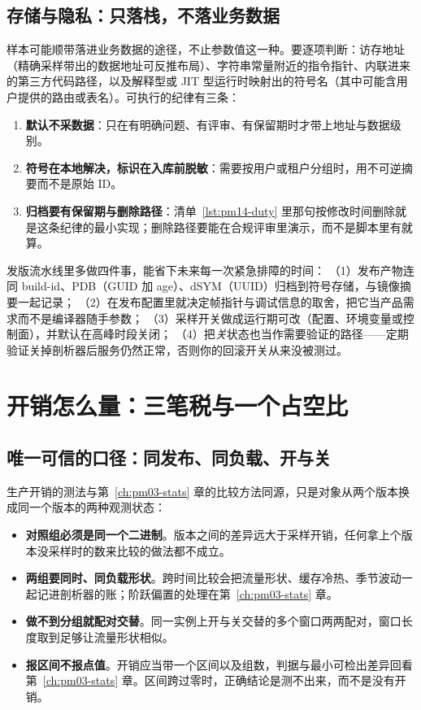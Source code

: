 \documentclass[12pt,a4paper,fontset=fandol]{ctexbook}
\begin{document}
\subsection{存储与隐私：只落栈，不落业务数据}
\label{sub:pm14-privacy}

样本可能顺带落进业务数据的途径，不止参数值这一种。要逐项判断：访存地址（精确采样带出的数据地址可反推布局）、字符串常量附近的指令指针、内联进来的第三方代码路径，以及解释型或 JIT 型运行时映射出的符号名（其中可能含用户提供的路由或表名）。可执行的纪律有三条：

\begin{enumerate}
  \item \textbf{默认不采数据}：只在有明确问题、有评审、有保留期时才带上地址与数据级别。
  \item \textbf{符号在本地解决，标识在入库前脱敏}：需要按用户或租户分组时，用不可逆摘要而不是原始 ID。
  \item \textbf{归档要有保留期与删除路径}：清单~\ref{lst:pm14-duty} 里那句按修改时间删除就是这条纪律的最小实现；删除路径要能在合规评审里演示，而不是脚本里有就算。
\end{enumerate}

\begin{bestpractice}[title={上线前一次性准备：符号、标识与开关}]
\label{box:pm14-prep}
发版流水线里多做四件事，能省下未来每一次紧急排障的时间：
（1）发布产物连同 build-id、PDB（GUID 加 age）、dSYM（UUID）归档到符号存储，与镜像摘要一起记录；
（2）在发布配置里就决定帧指针与调试信息的取舍，把它当产品需求而不是编译器随手参数；
（3）采样开关做成运行期可改（配置、环境变量或控制面），并默认在高峰时段关闭；
（4）把\emph{关}状态也当作需要验证的路径——定期验证关掉剖析器后服务仍然正常，否则你的回滚开关从来没被测过。
\end{bestpractice}

\section{开销怎么量：三笔税与一个占空比}
\label{sec:pm14-overhead}

\subsection{唯一可信的口径：同发布、同负载、开与关}
\label{sub:pm14-ab}

生产开销的测法与第~\ref{ch:pm03-stats} 章的比较方法同源，只是对象从两个版本换成同一个版本的两种观测状态：

\begin{itemize}
  \item \textbf{对照组必须是同一个二进制}。版本之间的差异远大于采样开销，任何拿上个版本没采样时的数来比较的做法都不成立。
  \item \textbf{两组要同时、同负载形状}。跨时间比较会把流量形状、缓存冷热、季节波动一起记进剖析器的账；阶跃偏置的处理在第~\ref{ch:pm03-stats} 章。
  \item \textbf{做不到分组就配对交替}。同一实例上开与关交替的多个窗口两两配对，窗口长度取到足够让流量形状相似。
  \item \textbf{报区间不报点值}。开销应当带一个区间以及组数，判据与最小可检出差异回看第~\ref{ch:pm03-stats} 章。区间跨过零时，正确结论是测不出来，而不是没有开销。
\end{itemize}
\end{document}
